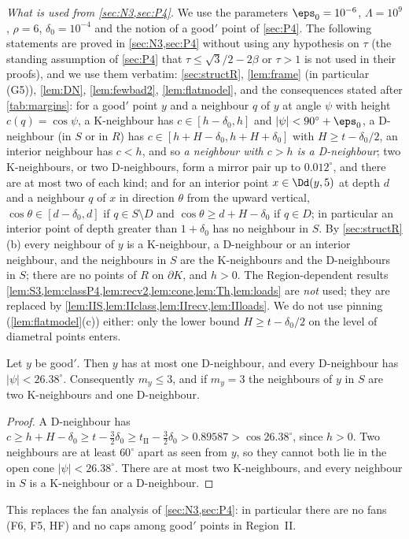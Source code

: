 \emph{What is used from \cref{sec:N3,sec:P4}.} We use the parameters $\eps_0=10^{-6}$, $\Lambda=10^9$, $\rho=6$, $\delta_0=10^{-4}$ and the notion of a good$'$ point of \cref{sec:P4}. The following statements are proved in \cref{sec:N3,sec:P4} without using any hypothesis on $\tau$ (the standing assumption of \cref{sec:P4} that $\tau\le\sqrt3/2-2\beta$ or $\tau>1$ is not used in their proofs), and we use them verbatim: \cref{sec:structR}, \cref{lem:frame} (in particular (G5)), \cref{lem:DN}, \cref{lem:fewbad2}, \cref{lem:flatmodel}, and the consequences stated after \cref{tab:margins}: for a good$'$ point $y$ and a neighbour $q$ of $y$ at angle $\psi$ with height $c(q)=\cos\psi$, a K-neighbour has $c\in[h-\delta_0,h]$ and $|\psi|<90^\circ+\eps_0$, a D-neighbour (in $S$ or in $R$) has $c\in[h+H-\delta_0,h+H+\delta_0]$ with $H\ge t-\delta_0/2$, an interior neighbour has $c<h$, and so \emph{a neighbour with $c>h$ is a D-neighbour}; two K-neighbours, or two D-neighbours, form a mirror pair up to $0.012^\circ$, and there are at most two of each kind; and for an interior point $x\in\Dd(y,5)$ at depth $d$ and a neighbour $q$ of $x$ in direction $\theta$ from the upward vertical, $\cos\theta\in[d-\delta_0,d]$ if $q\in S\setminus D$ and $\cos\theta\ge d+H-\delta_0$ if $q\in D$; in particular an interior point of depth greater than $1+\delta_0$ has no neighbour in $S$. By \cref{sec:structR}(b) every neighbour of $y$ is a K-neighbour, a D-neighbour or an interior neighbour, and the neighbours in $S$ are the K-neighbours and the D-neighbours in $S$; there are no points of $R$ on $\partial K$, and $h>0$. The Region-dependent results \cref{lem:S3,lem:classP4,lem:recv2,lem:cone,lem:Th,lem:loads} are \emph{not} used; they are replaced by \cref{lem:IIS,lem:IIclass,lem:IIrecv,lem:IIloads}. We do not use pinning (\cref{lem:flatmodel}(c)) either: only the lower bound $H\ge t-\delta_0/2$ on the level of diametral points enters.

\begin{lemma}\label{lem:IIS}
Let $y$ be good$'$. Then $y$ has at most one D-neighbour, and every D-neighbour has $|\psi|<26.38^\circ$. Consequently $m_y\le3$, and if $m_y=3$ the neighbours of $y$ in $S$ are two K-neighbours and one D-neighbour.
\end{lemma}
\begin{proof}
A D-neighbour has $c\ge h+H-\delta_0\ge t-\frac32\delta_0\ge t_{\mathrm{II}}-\frac32\delta_0>0.89587>\cos26.38^\circ$, since $h>0$. Two neighbours are at least $60^\circ$ apart as seen from $y$, so they cannot both lie in the open cone $|\psi|<26.38^\circ$. There are at most two K-neighbours, and every neighbour in $S$ is a K-neighbour or a D-neighbour.
\end{proof}
This replaces the fan analysis of \cref{sec:N3,sec:P4}: in particular there are no fans (F6, F5, HF) and no caps among good$'$ points in Region~II.

